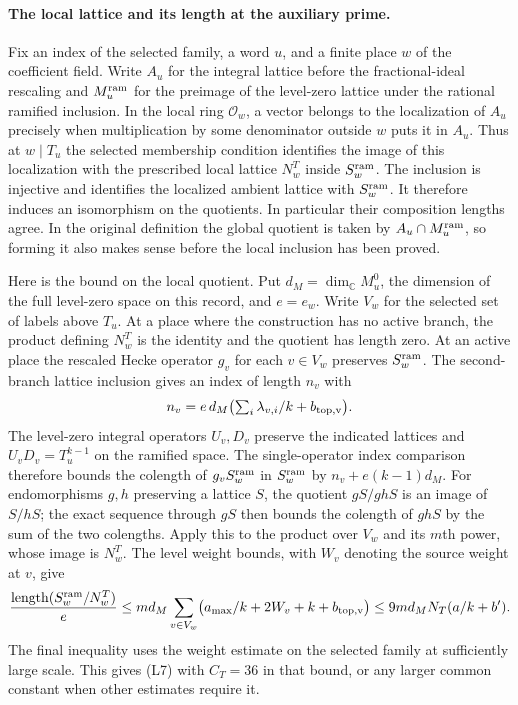 \paragraph{The local lattice and its length at the auxiliary prime.}\label{assembly:auxlength}
Fix an index of the selected family, a word $u$, and a finite place $w$
of the coefficient field. Write $A_u$ for the integral lattice before
the fractional-ideal rescaling and $M^{\rm ram}_u$ for the preimage of
the level-zero lattice under the rational ramified inclusion. In the
local ring $\mathcal O_w$, a vector belongs to the localization of
$A_u$ precisely when multiplication by some denominator outside $w$
puts it in $A_u$. Thus at $w\mid T_u$ the selected membership condition
identifies the image of this localization with the prescribed local
lattice $N^T_w$ inside $S^{\rm ram}_w$. The inclusion is injective and
identifies the localized ambient lattice with $S^{\rm ram}_w$.
It therefore induces an isomorphism on the quotients. In particular
their composition lengths agree. In the original definition the
global quotient is taken by $A_u\cap M^{\rm ram}_u$, so forming it
also makes sense before the local inclusion has been proved.

Here is the bound on the local quotient. Put $d_M=\dim_{\mathbb C}M^0_u$,
the dimension of the full level-zero space on this record, and
$e=e_w$. Write $V_w$ for the selected set of labels above $T_u$.
At a place where the construction has no active branch, the product
defining $N^T_w$ is the identity and the quotient has length zero.
At an active place the rescaled Hecke operator $g_v$ for each $v\in V_w$
preserves $S^{\rm ram}_w$. The second-branch lattice inclusion gives
an index of length $n_v$ with
\[
 n_v=e\,d_M\bigl(\textstyle\sum_i\lambda_{v,i}/k+b_{\rm top,v}\bigr).
\]
The level-zero integral operators $U_v,D_v$ preserve the indicated
lattices and $U_vD_v=T_u^{k-1}$ on the ramified space. The single-operator
index comparison therefore bounds the colength of $g_v S^{\rm ram}_w$
in $S^{\rm ram}_w$ by $n_v+e(k-1)d_M$.
For endomorphisms $g,h$ preserving a lattice $S$, the quotient
$gS/ghS$ is an image of $S/hS$; the exact sequence through $gS$
then bounds the colength of $ghS$ by the sum of the two colengths.
Apply this to the product over $V_w$ and its $m$th power, whose image
is $N^T_w$. The level weight bounds, with $W_v$ denoting the source
weight at $v$, give
\[
 \frac{\operatorname{length}(S^{\rm ram}_w/N^T_w)}{e}
 \le m d_M \sum_{v\in V_w}
 \bigl(a_{\max}/k+2W_v+k+b_{\rm top,v}\bigr)
 \le 9m d_M N_T(a/k+b').
\]
The final inequality uses the weight estimate on the selected family
at sufficiently large scale. This gives (L7) with $C_T=36$ in that
bound, or any larger common constant when other estimates require it.

